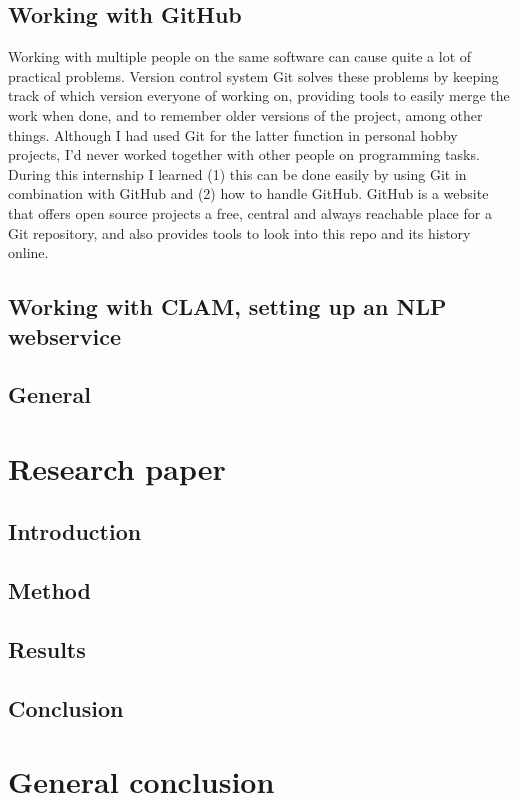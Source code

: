 \documentclass[12pt]{article}
\begin{document}
\subsection{Working with GitHub}
Working with multiple people on the same software can cause quite a lot of practical problems. Version control system Git solves these problems by keeping track of which version everyone of working on, providing tools to easily merge the work when done, and to remember older versions of the project, among other things. Although I had used Git for the latter function in personal hobby projects, I'd never worked together with other people on programming tasks. During this internship I learned (1) this can be done easily by using Git in combination with GitHub and (2) how to handle GitHub. GitHub is a website that offers open source projects a free, central and always reachable place for a Git repository, and also provides tools to look into this repo and its history online.

\subsection{Working with CLAM, setting up an NLP webservice}

\subsection{General}


\section{Research paper}

\subsection{Introduction}

\subsection{Method}

\subsection{Results}

\subsection{Conclusion}

\section{General conclusion}
\end{document}
